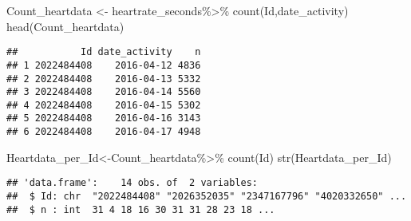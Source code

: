\documentclass[
]{article}
\newenvironment{Shaded}{\begin{snugshade}}{\end{snugshade}}
\newcommand{\AttributeTok}[1]{\textcolor[rgb]{0.77,0.63,0.00}{#1}}
\newcommand{\ConstantTok}[1]{\textcolor[rgb]{0.00,0.00,0.00}{#1}}
\newcommand{\FunctionTok}[1]{\textcolor[rgb]{0.00,0.00,0.00}{#1}}
\newcommand{\NormalTok}[1]{#1}
\newcommand{\OtherTok}[1]{\textcolor[rgb]{0.56,0.35,0.01}{#1}}
\newcommand{\SpecialCharTok}[1]{\textcolor[rgb]{0.00,0.00,0.00}{#1}}
\newcommand{\StringTok}[1]{\textcolor[rgb]{0.31,0.60,0.02}{#1}}
\begin{document}
\begin{Shaded}
\end{Shaded}

\begin{Shaded}
\begin{Highlighting}[]
\NormalTok{Count\_heartdata }\OtherTok{\textless{}{-}}\NormalTok{ heartrate\_seconds}\SpecialCharTok{\%\textgreater{}\%}
  \FunctionTok{count}\NormalTok{(Id,date\_activity)}
\FunctionTok{head}\NormalTok{(Count\_heartdata)}
\end{Highlighting}
\end{Shaded}

\begin{verbatim}
##           Id date_activity    n
## 1 2022484408    2016-04-12 4836
## 2 2022484408    2016-04-13 5332
## 3 2022484408    2016-04-14 5560
## 4 2022484408    2016-04-15 5302
## 5 2022484408    2016-04-16 3143
## 6 2022484408    2016-04-17 4948
\end{verbatim}

\begin{Shaded}
\begin{Highlighting}[]
\NormalTok{Heartdata\_per\_Id}\OtherTok{\textless{}{-}}\NormalTok{Count\_heartdata}\SpecialCharTok{\%\textgreater{}\%}
  \FunctionTok{count}\NormalTok{(Id)}
\FunctionTok{str}\NormalTok{(Heartdata\_per\_Id)}
\end{Highlighting}
\end{Shaded}

\begin{verbatim}
## 'data.frame':    14 obs. of  2 variables:
##  $ Id: chr  "2022484408" "2026352035" "2347167796" "4020332650" ...
##  $ n : int  31 4 18 16 30 31 31 28 23 18 ...
\end{verbatim}

\begin{Shaded}
\end{Shaded}
\end{document}
